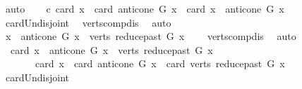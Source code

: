 \begin{isabellebody}
\ auto\isanewline
\ \ \isamarkupfalse%
\ c{}{\isacharcolon}{\kern0pt}\ {\isachardoublequoteopen}card\ {\isacharbraceleft}{\kern0pt}x{\isacharbraceright}{\kern0pt}\ {\isacharplus}{\kern0pt}\ card\ {\isacharparenleft}{\kern0pt}anticone\ G\ x{\isacharparenright}{\kern0pt}\ {\isacharequal}{\kern0pt}\ card\ {\isacharparenleft}{\kern0pt}{\isacharbraceleft}{\kern0pt}x{\isacharbraceright}{\kern0pt}\ {\isasymunion}\ {\isacharparenleft}{\kern0pt}anticone\ G\ x{\isacharparenright}{\kern0pt}{\isacharparenright}{\kern0pt}{\isachardoublequoteclose}\ \isamarkupfalse%
\ card{\isacharunderscore}{\kern0pt}Un{\isacharunderscore}{\kern0pt}disjoint\isanewline
\ \ verts{\isacharunderscore}{\kern0pt}comp{\isacharunderscore}{\kern0pt}dis\ \isamarkupfalse%
\ auto\isanewline
\ \ \isamarkupfalse%
\ {\isachardoublequoteopen}{\isacharparenleft}{\kern0pt}{\isacharbraceleft}{\kern0pt}x{\isacharbraceright}{\kern0pt}\ {\isasymunion}\ {\isacharparenleft}{\kern0pt}anticone\ G\ x{\isacharparenright}{\kern0pt}{\isacharparenright}{\kern0pt}\ {\isasyminter}\ verts\ {\isacharparenleft}{\kern0pt}reduce{\isacharunderscore}{\kern0pt}past\ G\ x{\isacharparenright}{\kern0pt}\ {\isacharequal}{\kern0pt}\ {\isacharbraceleft}{\kern0pt}{\isacharbraceright}{\kern0pt}{\isachardoublequoteclose}\ \isamarkupfalse%
\ verts{\isacharunderscore}{\kern0pt}comp{\isacharunderscore}{\kern0pt}dis\ \isamarkupfalse%
\ auto\isanewline
\ \ \isamarkupfalse%
\ \isamarkupfalse%
\ {\isachardoublequoteopen}\ card\ {\isacharparenleft}{\kern0pt}{\isacharbraceleft}{\kern0pt}x{\isacharbraceright}{\kern0pt}\ {\isasymunion}\ {\isacharparenleft}{\kern0pt}anticone\ G\ x{\isacharparenright}{\kern0pt}\ {\isasymunion}\ verts\ {\isacharparenleft}{\kern0pt}reduce{\isacharunderscore}{\kern0pt}past\ G\ x{\isacharparenright}{\kern0pt}{\isacharparenright}{\kern0pt}\ \isanewline
\ \ \ \ \ \ {\isacharequal}{\kern0pt}\ card\ {\isacharbraceleft}{\kern0pt}x{\isacharbraceright}{\kern0pt}\ {\isacharplus}{\kern0pt}\ card\ {\isacharparenleft}{\kern0pt}anticone\ G\ x{\isacharparenright}{\kern0pt}\ {\isacharplus}{\kern0pt}\ card\ {\isacharparenleft}{\kern0pt}verts\ {\isacharparenleft}{\kern0pt}reduce{\isacharunderscore}{\kern0pt}past\ G\ x{\isacharparenright}{\kern0pt}{\isacharparenright}{\kern0pt}\isanewline
\ \ \ \ \ \ \ \ {\isachardoublequoteclose}\ \isamarkupfalse%
\ card{\isacharunderscore}{\kern0pt}Un{\isacharunderscore}{\kern0pt}disjoint\isanewline
\ \ \ \ \isamarkupfalse%

\end{isabellebody}
